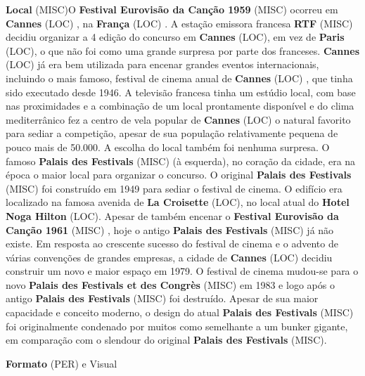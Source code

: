 \documentclass[12pt,a4paper]{article}
\begin{document}
\textbf{Local} (MISC)O \textbf{Festival Eurovisão da Canção 1959} (MISC) ocorreu em \textbf{Cannes} (LOC) , na \textbf{França} (LOC) . A estação emissora francesa \textbf{RTF} (MISC) decidiu organizar a 4 edição do concurso em \textbf{Cannes} (LOC), em vez de \textbf{Paris} (LOC), o que não foi como uma grande surpresa por parte dos franceses. \textbf{Cannes} (LOC) já era bem utilizada para encenar grandes eventos internacionais, incluindo o mais famoso, festival de cinema anual de \textbf{Cannes} (LOC) , que tinha sido executado desde 1946. A televisão francesa tinha um estúdio local, com base nas proximidades e a combinação de um local prontamente disponível e do clima mediterrânico fez a centro de vela popular de \textbf{Cannes} (LOC) o natural favorito para sediar a competição, apesar de sua população relativamente pequena de pouco mais de 50.000. A escolha do local também foi nenhuma surpresa. O famoso \textbf{Palais des Festivals} (MISC) (à esquerda), no coração da cidade, era na época o maior local para organizar o concurso. O original \textbf{Palais des Festivals} (MISC) foi construído em 1949 para sediar o festival de cinema. O edifício era localizado na famosa avenida de \textbf{La Croisette} (LOC), no local atual do \textbf{Hotel Noga Hilton} (LOC). Apesar de também encenar o \textbf{Festival Eurovisão da Canção 1961} (MISC) , hoje o antigo \textbf{Palais des Festivals} (MISC) já não existe. Em resposta ao crescente sucesso do festival de cinema e o advento de várias convenções de grandes empresas, a cidade de \textbf{Cannes} (LOC) decidiu construir um novo e maior espaço em 1979. O festival de cinema mudou-se para o novo \textbf{Palais des Festivals et des Congrès} (MISC) em 1983 e logo após o antigo \textbf{Palais des Festivals} (MISC) foi destruído. Apesar de sua maior capacidade e conceito moderno, o design do atual \textbf{Palais des Festivals} (MISC) foi originalmente condenado por muitos como semelhante a um bunker gigante, em comparação com o slendour do original \textbf{Palais des Festivals} (MISC).



\textbf{Formato} (PER) e Visual
\end{document}
